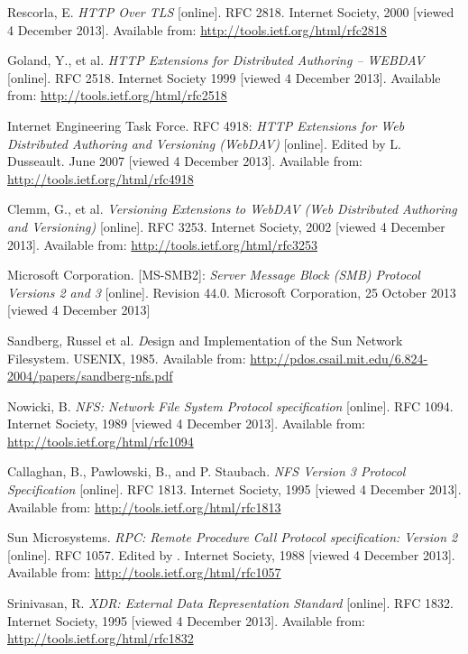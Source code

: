 \begin{thebibliography}{99}
	{\sc Rescorla,} E.
	\emph{HTTP Over TLS}
	[online].
	RFC 2818.
	Internet Society, 2000 [viewed 4 December 2013].
	Available from: \url{http://tools.ietf.org/html/rfc2818}

	{\sc Goland,} Y., et al.
	\emph{HTTP Extensions for Distributed Authoring -- WEBDAV}
	[online].
	RFC 2518.
	Internet Society 1999 [viewed 4 December 2013].
	Available from: \url{http://tools.ietf.org/html/rfc2518}

	{\sc Internet Engineering Task Force}.
	RFC 4918:
	\emph{HTTP Extensions for Web Distributed Authoring and Versioning (WebDAV)}
	[online].
	Edited by L. Dusseault.
	June 2007 [viewed 4 December 2013].
	Available from: \url{http://tools.ietf.org/html/rfc4918}

	{\sc Clemm,} G., et al.
	\emph{Versioning Extensions to WebDAV (Web Distributed Authoring and Versioning)}
	[online].
	RFC 3253.
	Internet Society, 2002 [viewed 4 December 2013].
	Available from: \url{http://tools.ietf.org/html/rfc3253}

	{\sc Microsoft Corporation}.
	[MS-SMB2]:
	\emph{Server Message Block (SMB) Protocol Versions 2 and 3}
	[online].
	Revision 44.0.
	Microsoft Corporation, 25 October 2013 [viewed 4 December 2013]

	{\sc Sandberg,} Russel et al.
	{\emph Design and Implementation of the Sun Network Filesystem}.
	USENIX, 1985.
	Available from: \url{http://pdos.csail.mit.edu/6.824-2004/papers/sandberg-nfs.pdf}

	{\sc Nowicki,} B.
	\emph{NFS: Network File System Protocol specification}
	[online].
	RFC 1094.
	Internet Society, 1989 [viewed 4 December 2013].
	Available from: \url{http://tools.ietf.org/html/rfc1094}

	{\sc Callaghan,} B., {\sc Pawlowski,} B., and P. {\sc Staubach}.
	\emph{NFS Version 3 Protocol Specification}
	[online].
	RFC 1813.
	Internet Society, 1995 [viewed 4 December 2013].
	Available from: \url{http://tools.ietf.org/html/rfc1813}

	{\sc Sun Microsystems}.
	\emph{RPC: Remote Procedure Call Protocol specification: Version 2}
	[online].
	RFC 1057.
	Edited by .
	Internet Society, 1988 [viewed 4 December 2013].
	Available from: \url{http://tools.ietf.org/html/rfc1057}

	{\sc Srinivasan,} R.
	\emph{XDR: External Data Representation Standard}
	[online].
	RFC 1832.
	Internet Society, 1995 [viewed 4 December 2013].
	Available from: \url{http://tools.ietf.org/html/rfc1832}


\end{thebibliography}
